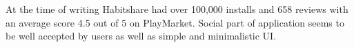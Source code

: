 At the time of writing Habitshare had over 100,000 installs and 658 reviews with an average score 4.5 out of 5 on PlayMarket.
Social part of application seems to be well accepted by users as well as simple and minimalistic UI\@.

%
%
%
%
%
%
%
%

